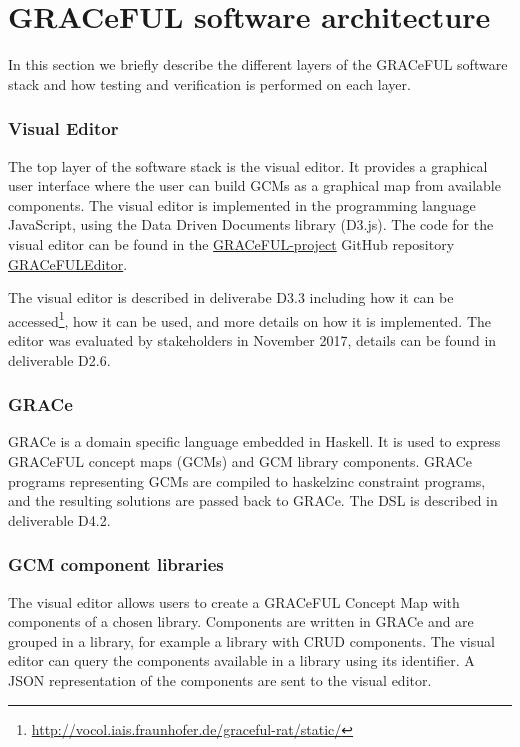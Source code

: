 \documentclass{article}
\begin{document}
\section{GRACeFUL software architecture}
In this section we briefly describe the different layers of
the GRACeFUL software stack and how testing and
verification is performed on each layer.

\subsubsection*{Visual Editor}

The top layer of the software stack is the visual editor.
%
It provides a graphical user interface where the user can build GCMs
as a graphical map from available components.
%
The visual editor is implemented in the programming language
JavaScript, using the Data Driven Documents library (D3.js).
%
The code for the visual editor can be found in the
\href{https://github.com/GRACeFUL-project}{GRACeFUL-project} GitHub
repository
\href{https://github.com/GRACeFUL-project/GRACeFULEditor}{GRACeFULEditor}.

The visual editor is described in deliverabe D3.3 including how it can be
accessed\footnote{\url{http://vocol.iais.fraunhofer.de/graceful-rat/static/}},
how it can be used, and more details on how it is implemented.
%
The editor was evaluated by stakeholders in November 2017, details can
be found in deliverable D2.6.

\subsubsection*{GRACe}

GRACe is a domain specific language embedded in Haskell. It is used to express
GRACeFUL concept maps (GCMs) and GCM library components. GRACe programs
representing GCMs are compiled to haskelzinc constraint programs, and the
resulting solutions are passed back to GRACe. The DSL is described in deliverable
D4.2.

\subsubsection*{GCM component libraries}

The visual editor allows users to create a GRACeFUL Concept Map with components
of a chosen library. Components are written in GRACe and are grouped in a
library, for example a library with CRUD components. The visual editor can query
the components available in a library using its identifier. A JSON
representation of the components are sent to the visual editor.
\end{document}
